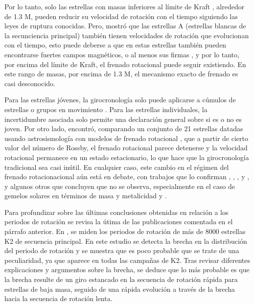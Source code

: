 Por lo tanto, solo las estrellas con masas inferiores al límite de Kraft \cite{Kraft67}, alrededor de 1.3 M, pueden reducir su velocidad de rotación con el tiempo siguiendo las leyes de ruptura conocidas. Pero, \cite{Zorec12} mostró que las estrellas A (estrellas blancas de la secunciencia principal) también tienen velocidades de rotación que evolucionan con el tiempo, esto puede deberse a que en estas estrellas también pueden encontrarse fuertes campos magnéticos, o al menos sus firmas \cite{Balona17}, y por lo tanto, por encima del límite de Kraft, el frenado rotacional puede seguir existiendo. En este rango de masas, por encima de 1.3 M, el mecanismo exacto de frenado es casi desconocido.

Para las estrellas jóvenes, la girocronología solo puede aplicarse a cúmulos de estrellas o grupos en movimiento \cite{Curtis19}. Para las estrellas individuales, la incertidumbre asociada solo permite una declaración general sobre si es o no es joven. Por otro lado, \cite{Saders16} encontró, comparando un conjunto de 21 estrellas datadas usando astrosismología con modelos de frenado rotacional \cite{Saders13}, que a partir de cierto valor del número de Rossby, el frenado rotacional parece detenerse y la velocidad rotacional permanece en un estado estacionario, lo que hace que la girocronología tradicional sea casi inútil. En cualquier caso, este cambio en el régimen del frenado rotacionacional aún está en debate, con trabajos que lo confirman \cite{Gordon21}, \cite{Kitchatinov17}, \cite{Metcalfe19}, \cite{Metcalfe17} y \cite{Saders19}, y algunos otros que concluyen que no se observa, especialmente en el caso de gemelos solares en términos de masa y metalicidad \cite{Barnes16} y \cite{Oliveira19}.

Para profundizar sobre las últimas conclusiones obtenidas en relación a los periodos de rotación se revisa la útima de las publicaciones comentada en el párrafo anterior. En \cite{Gordon21}, se miden los periodos de rotación de más de 8000 estrellas K2 de secuencia principal. En este estudio se detecta la brecha en la distribución del periodo de rotación y se muestra que es poco probable que se trate de una peculiaridad, ya que aparece en todas las campañas de K2. Tras revisar diferentes explicaciones y argumentos sobre la brecha, se deduce que lo más probable es que la brecha resulte de un giro estancado en la secuencia de rotación rápida para estrellas de baja masa, seguido de una rápida evolución a través de la brecha hacia la secuencia de rotación lenta.


